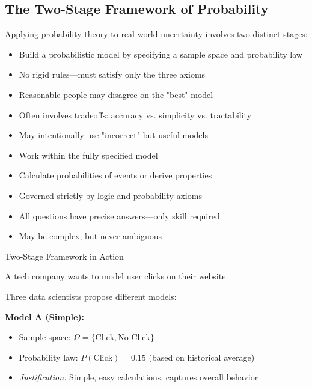 \begin{itemize}
\subsection{The Two-Stage Framework of Probability}

Applying probability theory to real-world uncertainty involves two distinct stages:

\begin{itemize}
    \item Build a probabilistic model by specifying a sample space and probability law
    \item No rigid rules—must satisfy only the three axioms
    \item Reasonable people may disagree on the "best" model
    \item Often involves tradeoffs: accuracy vs. simplicity vs. tractability
    \item May intentionally use "incorrect" but useful models
\end{itemize}

\begin{itemize}
    \item Work within the fully specified model
    \item Calculate probabilities of events or derive properties
    \item Governed strictly by logic and probability axioms
    \item All questions have precise answers—only skill required
    \item May be complex, but never ambiguous
\end{itemize}

\begin{exampleboxbreak}{Two-Stage Framework in Action}

 A tech company wants to model user clicks on their website.


Three data scientists propose different models:

\textbf{Model A (Simple):}
\begin{itemize}
    \item Sample space: $\Omega = \{\text{Click}, \text{No Click}\}$
    \item Probability law: $P(\text{Click}) = 0.15$ (based on historical average)
    \item \textit{Justification:} Simple, easy calculations, captures overall behavior
\end{itemize}


\end{exampleboxbreak}
\end{itemize}
